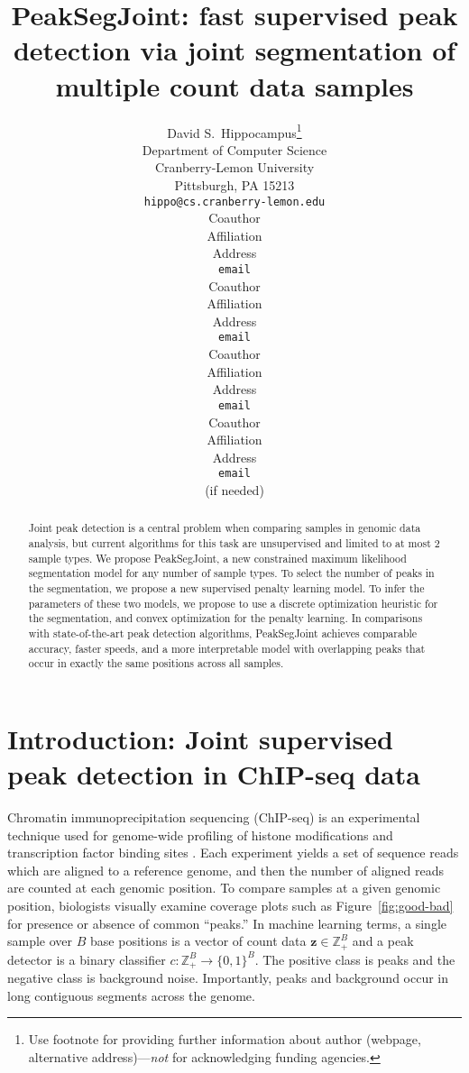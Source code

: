 \documentclass{article} %
\title{PeakSegJoint: fast supervised peak detection via joint
  segmentation of multiple count data samples}
\author{
David S.~Hippocampus\thanks{ Use footnote for providing further information
about author (webpage, alternative address)---\emph{not} for acknowledging
funding agencies.} \\
Department of Computer Science\\
Cranberry-Lemon University\\
Pittsburgh, PA 15213 \\
\texttt{hippo@cs.cranberry-lemon.edu} \\
\And
Coauthor \\
Affiliation \\
Address \\
\texttt{email} \\
\AND
Coauthor \\
Affiliation \\
Address \\
\texttt{email} \\
\And
Coauthor \\
Affiliation \\
Address \\
\texttt{email} \\
\And
Coauthor \\
Affiliation \\
Address \\
\texttt{email} \\
(if needed)\\
}
\newcommand{\ZZ}{\mathbb Z}
\begin{document}
\maketitle

\begin{abstract}
  Joint peak detection is a central problem when comparing samples in
  genomic data analysis, but current algorithms for this task are
  unsupervised and limited to at most 2 sample types. We propose
  PeakSegJoint, a new constrained maximum likelihood segmentation
  model for any number of sample types. To select the number of peaks
  in the segmentation, we propose a new supervised penalty learning
  model. To infer the parameters of these two models, we propose to
  use a discrete optimization heuristic for the segmentation, and
  convex optimization for the penalty learning. In comparisons with
  state-of-the-art peak detection algorithms, PeakSegJoint achieves
  comparable accuracy, faster speeds, and a more interpretable model
  with overlapping peaks that occur in exactly the same positions
  across all samples.
\end{abstract}

\section{Introduction: Joint supervised peak detection in ChIP-seq data}


Chromatin immunoprecipitation sequencing (ChIP-seq) is an experimental
technique used for genome-wide profiling of histone modifications and
transcription factor binding sites \citep{practical}. Each experiment
yields a set of sequence reads which are aligned to a reference
genome, and then the number of aligned reads are counted at each
genomic position. To compare samples at a given genomic position,
biologists visually examine coverage plots such as
Figure~\ref{fig:good-bad} for presence or absence of common ``peaks.''
In machine learning terms, a single sample over $B$ base positions is
a vector of count data $\mathbf z\in\ZZ_+^B$ and a peak detector is a
binary classifier $c:\ZZ_+^B\rightarrow\{0, 1\}^B$. The positive class
is peaks and the negative class is background noise. Importantly,
peaks and background occur in long contiguous segments across the
genome.
\end{document}
